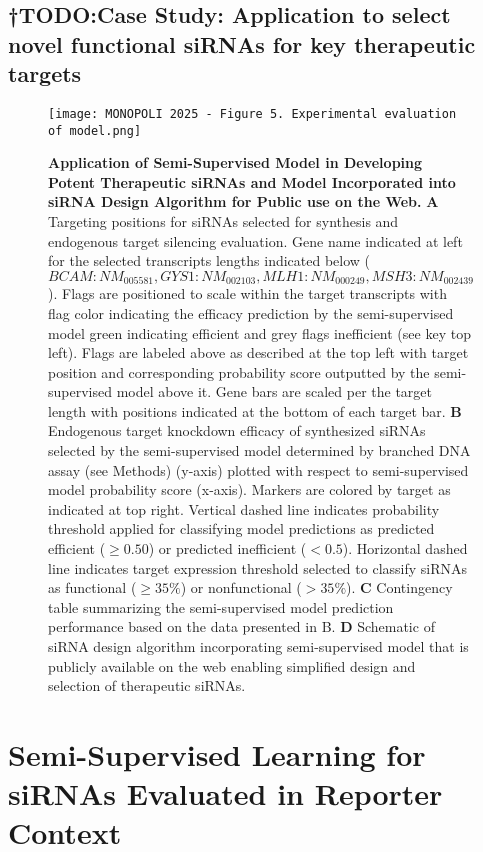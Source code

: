 \documentclass{report}
\begin{document}
\subsection{†TODO:Case Study: Application to select novel functional siRNAs for key therapeutic targets}


\begin{figure}
    \centering
    \texttt{[image: MONOPOLI 2025 - Figure 5. Experimental evaluation of model.png]}
    \caption{\textbf{Application of Semi-Supervised Model in Developing Potent Therapeutic siRNAs and Model Incorporated into siRNA Design Algorithm for Public use on the Web.} \textbf{A} Targeting positions for siRNAs selected for synthesis and endogenous target silencing evaluation. Gene name indicated at left for the selected transcripts lengths indicated below ($BCAM: NM_005581, GYS1: NM_002103, MLH1: NM_000249, MSH3: NM_002439$). Flags are positioned to scale within the target transcripts with flag color indicating the efficacy prediction by the semi-supervised model green indicating efficient and grey flags inefficient (see key top left). Flags are labeled above as described at the top left with target position and corresponding probability score outputted by the semi-supervised model above it. Gene bars are scaled per the target length with positions indicated at the bottom of each target bar. \textbf{B} Endogenous target knockdown efficacy of synthesized siRNAs selected by the semi-supervised model determined by branched DNA assay (see Methods) (y-axis) plotted with respect to semi-supervised model probability score (x-axis). Markers are colored by target as indicated at top right. Vertical dashed line indicates probability threshold applied for classifying model predictions as predicted efficient ($\geq0.50$) or predicted inefficient ($<0.5$). Horizontal dashed line indicates target expression threshold selected to classify siRNAs as functional ($\geq35\%$) or nonfunctional ($>35\%$). \textbf{C} Contingency table summarizing the semi-supervised model prediction performance based on the data presented in B. \textbf{D} Schematic of siRNA design algorithm incorporating semi-supervised model that is publicly available on the web enabling simplified design and selection of therapeutic siRNAs.}
    \label{fig:Figure† 5}
\end{figure}

\section{Semi-Supervised Learning for siRNAs Evaluated in Reporter Context}
\end{document}
